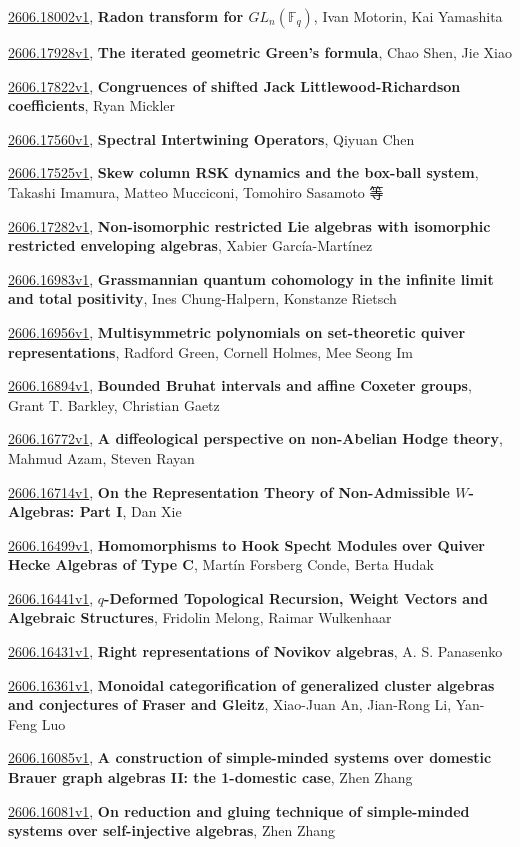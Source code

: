 \documentclass[9pt, a4paper]{article}
\theoremstyle{plain}
\theoremstyle{definition}
\theoremstyle{remark}
\newcommand{\arxiv}[3]{\href{https://arxiv.org/abs/#1}{#1}, \textbf{\textcolor{arxivblue}{#2}}, #3}
\begin{document}
\arxiv{2606.18002v1}{Radon transform for $GL_n(\mathbb{F}_q)$}{Ivan Motorin, Kai Yamashita}

\arxiv{2606.17928v1}{The iterated geometric Green's formula}{Chao Shen, Jie Xiao}

\arxiv{2606.17822v1}{Congruences of shifted Jack Littlewood-Richardson coefficients}{Ryan Mickler}

\arxiv{2606.17560v1}{Spectral Intertwining Operators}{Qiyuan Chen}

\arxiv{2606.17525v1}{Skew column RSK dynamics and the box-ball system}{Takashi Imamura, Matteo Mucciconi, Tomohiro Sasamoto 等}

\arxiv{2606.17282v1}{Non-isomorphic restricted Lie algebras with isomorphic restricted enveloping algebras}{Xabier García-Martínez}

\arxiv{2606.16983v1}{Grassmannian quantum cohomology in the infinite limit and total positivity}{Ines Chung-Halpern, Konstanze Rietsch}

\arxiv{2606.16956v1}{Multisymmetric polynomials on set-theoretic quiver representations}{Radford Green, Cornell Holmes, Mee Seong Im}

\arxiv{2606.16894v1}{Bounded Bruhat intervals and affine Coxeter groups}{Grant T. Barkley, Christian Gaetz}

\arxiv{2606.16772v1}{A diffeological perspective on non-Abelian Hodge theory}{Mahmud Azam, Steven Rayan}

\arxiv{2606.16714v1}{On the Representation Theory of Non-Admissible $W$-Algebras: Part I}{Dan Xie}

\arxiv{2606.16499v1}{Homomorphisms to Hook Specht Modules over Quiver Hecke Algebras of Type C}{Martín Forsberg Conde, Berta Hudak}

\arxiv{2606.16441v1}{$q$-Deformed Topological Recursion, Weight Vectors and Algebraic Structures}{Fridolin Melong, Raimar Wulkenhaar}

\arxiv{2606.16431v1}{Right representations of Novikov algebras}{A. S. Panasenko}

\arxiv{2606.16361v1}{Monoidal categorification of generalized cluster algebras and conjectures of Fraser and Gleitz}{Xiao-Juan An, Jian-Rong Li, Yan-Feng Luo}

\arxiv{2606.16085v1}{A construction of simple-minded systems over domestic Brauer graph algebras II: the 1-domestic case}{Zhen Zhang}

\arxiv{2606.16081v1}{On reduction and gluing technique of simple-minded systems over self-injective algebras}{Zhen Zhang}
\end{document}
